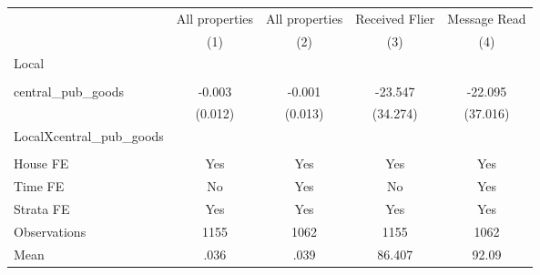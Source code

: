 {
\def\sym#1{\ifmmode^{#1}\else\(^{#1}\)\fi}
\begin{tabular}{l*{4}{c}}
\hline\hline
                &\multicolumn{1}{c}{All properties}&\multicolumn{1}{c}{All properties}&\multicolumn{1}{c}{Received Flier}&\multicolumn{1}{c}{Message Read}\\
                &\multicolumn{1}{c}{(1)}         &\multicolumn{1}{c}{(2)}         &\multicolumn{1}{c}{(3)}         &\multicolumn{1}{c}{(4)}         \\
\hline
Local           &                  &                  &                  &                  \\
                &                  &                  &                  &                  \\
central\_pub\_goods&   -0.003         &   -0.001         &  -23.547         &  -22.095         \\
                &  (0.012)         &  (0.013)         & (34.274)         & (37.016)         \\
LocalXcentral\_pub\_goods&                  &                  &                  &                  \\
                &                  &                  &                  &                  \\
House FE        &      Yes         &      Yes         &      Yes         &      Yes         \\
Time FE         &       No         &      Yes         &       No         &      Yes         \\
Strata FE       &      Yes         &      Yes         &      Yes         &      Yes         \\
\hline
Observations    &     1155         &     1062         &     1155         &     1062         \\
Mean            &     .036         &     .039         &   86.407         &    92.09         \\
\hline\hline
\end{tabular}
}
